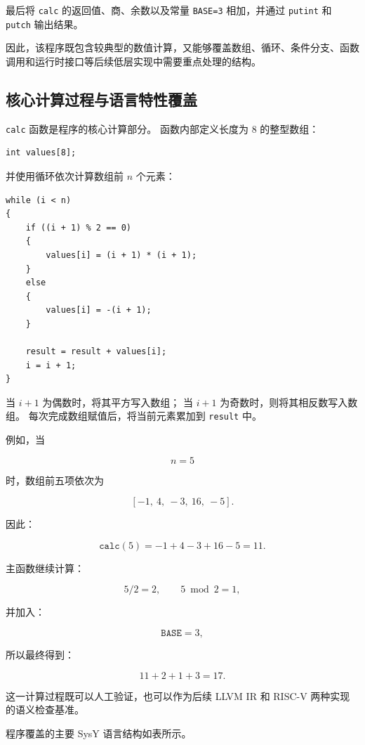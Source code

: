 \documentclass[12pt,a4paper]{ctexart}
\begin{document}
最后将 \texttt{calc} 的返回值、商、余数以及常量
\texttt{BASE=3} 相加，并通过 \texttt{putint} 和
\texttt{putch} 输出结果。

因此，该程序既包含较典型的数值计算，又能够覆盖数组、循环、条件分支、函数调用和运行时接口等后续低层实现中需要重点处理的结构。


\subsection{核心计算过程与语言特性覆盖}

\texttt{calc} 函数是程序的核心计算部分。
函数内部定义长度为 8 的整型数组：

\begin{lstlisting}
int values[8];
\end{lstlisting}

并使用循环依次计算数组前 $n$ 个元素：

\begin{lstlisting}
while (i < n)
{
    if ((i + 1) % 2 == 0)
    {
        values[i] = (i + 1) * (i + 1);
    }
    else
    {
        values[i] = -(i + 1);
    }

    result = result + values[i];
    i = i + 1;
}
\end{lstlisting}

当 $i+1$ 为偶数时，将其平方写入数组；
当 $i+1$ 为奇数时，则将其相反数写入数组。
每次完成数组赋值后，将当前元素累加到 \texttt{result} 中。

例如，当

\[
n=5
\]

时，数组前五项依次为

\[
[-1,\ 4,\ -3,\ 16,\ -5].
\]

因此：

\[
\texttt{calc}(5)
=
-1+4-3+16-5
=
11.
\]

主函数继续计算：

\[
5/2=2,
\qquad
5\bmod 2=1,
\]

并加入：

\[
\texttt{BASE}=3,
\]

所以最终得到：

\[
11+2+1+3=17.
\]

这一计算过程既可以人工验证，也可以作为后续 LLVM IR 和 RISC-V 两种实现的语义检查基准。

程序覆盖的主要 SysY 语言结构如表所示。
\end{document}
